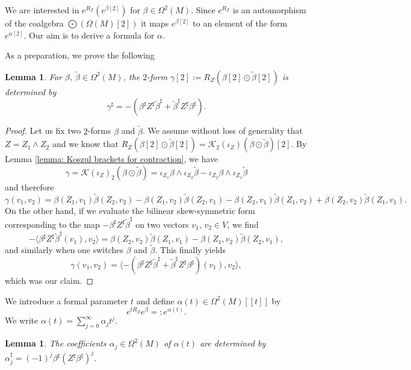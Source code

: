 \documentclass[11pt,thmsa]{amsart}
\newtheorem{lemma}[theorem]{Lemma}
\theoremstyle{definition}
\newcommand{\Koszul}{\mathcal{K}}
\begin{document}
{We are interested in $e^{R_Z}(e^{\beta[2]})$ for $\beta\in \Omega^2(M)$. 
Since $e^{R_Z}$ is an automorphism of the coalgebra $\bigodot(\Omega(M)[2])$
it maps $e^{\beta[2]}$ to an element of the form $e^{\alpha[2]}$. Our aim is to derive a formula for $\alpha$.


As a preparation, we prove the following

\begin{lemma}\label{lemma: sharp and the coderivation}
For $\beta$, $\tilde{\beta}\in \Omega^2(M)$, the $2$-form
$ \gamma[2]:=R_Z(\beta[2]\odot \tilde{\beta}[2])$
is determined by $$\gamma^\sharp = -\left(\beta^\sharp Z^\sharp \tilde{\beta}^\sharp + \tilde{\beta}^\sharp Z^\sharp \beta^\sharp\right).$$
\end{lemma}

\begin{proof}
Let us fix two $2$-forms $\beta$ and $\tilde{\beta}$.
 We assume without loss of generality that $Z=Z_1\wedge Z_2$
 and we know that $R_Z(\beta[2]\odot \tilde{\beta}[2])=\Koszul_2(\iota_Z)(\beta\odot \tilde{\beta})[2]$. 
By Lemma \ref{lemma: Koszul brackets for contraction}, we have
$$ \gamma= \Koszul(\iota_Z)_2(\beta\odot \tilde{\beta})= \iota_{Z_1}\beta \wedge \iota_{Z_2}\tilde{\beta} - \iota_{Z_2}\beta \wedge \iota_{Z_1}\tilde{\beta}$$
and therefore
$$ \gamma(v_1,v_2)=\beta(Z_1,v_1)\tilde{\beta}(Z_2,v_2) -
\beta(Z_1,v_2)\tilde{\beta}(Z_2,v_1) -
\beta(Z_2,v_1)\tilde{\beta}(Z_1,v_2) +
\beta(Z_2,v_2)\tilde{\beta}(Z_1,v_1).$$
On the other hand, if we evaluate the bilinear skew-symmetric form corresponding to the map $-\beta^\sharp Z^\sharp \tilde{\beta}^\sharp$ on two vectors $v_1$, $v_2 \in V$, we find
$$
-\langle \beta^\sharp Z^\sharp \tilde{\beta}^\sharp(v_1),v_2\rangle = \beta(Z_2,v_2)\tilde{\beta}(Z_1,v_1) - \beta(Z_1,v_2)\tilde{\beta}(Z_2,v_1),$$
and similarly when one switches $\beta$ and $\tilde{\beta}$.
This finally yields
$$\gamma(v_1,v_2) = \langle - \left(\beta^\sharp Z^\sharp \tilde{\beta}^\sharp + \tilde{\beta}^\sharp Z^\sharp \beta^\sharp \right)(v_1),v_2 \rangle,$$
which was our claim.
\end{proof}


We introduce a formal parameter $t$ and define $\alpha(t) \in \Omega^2(M)[[t]]$
by
\begin{equation}\label{equation: ODE} e^{tR_Z}e^{\beta}=:e^{\alpha(t)}.
\end{equation}
We write $\alpha(t)=\sum_{j=0}^\infty \alpha_j t^j$.

\begin{lemma}\label{lemma: sharp and the coderivation 2}
The coefficients $\alpha_j\in \Omega^2(M)$ of $\alpha(t)$ are determined by
$\alpha_j^\sharp = (-1)^j\beta^\sharp (Z^\sharp \beta^\sharp)^{j}.$ 
\end{lemma}

}
\end{document}

